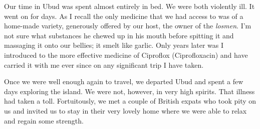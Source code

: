 Our time in Ubud was spent almost entirely in bed. We were both
violently ill. It went on for days. As I recall the only medicine that
we had access to was of a home-made variety, generously offered by our
host, the owner of the \emph{losmen}. I'm not sure what substances he
chewed up in his mouth before spitting it and massaging it onto our
bellies; it smelt like garlic. Only years later was I introduced to the
more effective medicine of Ciproflox (Ciprofloxacin) and have carried it with me
ever since on any significant trip I have taken.

Once we were well enough again to travel, we departed Ubud and spent a
few days exploring the island. We were not, however, in very high
spirits. That illness had taken a toll. Fortuitously, we met a couple of
British expats who took pity on us and invited us to stay in their very
lovely home where we were able to relax and regain some strength.

